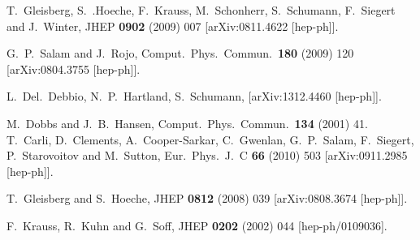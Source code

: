 \documentclass[11pt]{article}
\begin{document}
\begin{thebibliography}{99}


  T.~Gleisberg, S.~.Hoeche, F.~Krauss, M.~Schonherr, S.~Schumann, F.~Siegert and J.~Winter,
  JHEP {\bf 0902} (2009) 007
  [arXiv:0811.4622 [hep-ph]].
  
  G.~P.~Salam and J.~Rojo,
  Comput.\ Phys.\ Commun.\  {\bf 180} (2009) 120
  [arXiv:0804.3755 [hep-ph]].

  L.~Del.~Debbio, N.~P.~Hartland, S.~Schumann, [arXiv:1312.4460 [hep-ph]].
  
  M.~Dobbs and J.~B.~Hansen,
  Comput.\ Phys.\ Commun.\  {\bf 134} (2001) 41.\\
  
  T.~Carli, D.~Clements, A.~Cooper-Sarkar, C.~Gwenlan, G.~P.~Salam, F.~Siegert, P.~Starovoitov and M.~Sutton,
  Eur.\ Phys.\ J.\ C {\bf 66} (2010) 503
  [arXiv:0911.2985 [hep-ph]].
  


  
  T.~Gleisberg and S.~Hoeche,
  JHEP {\bf 0812} (2008) 039
  [arXiv:0808.3674 [hep-ph]].

  F.~Krauss, R.~Kuhn and G.~Soff,
  JHEP {\bf 0202} (2002) 044
  [hep-ph/0109036].
  
\end{thebibliography}
\end{document}

